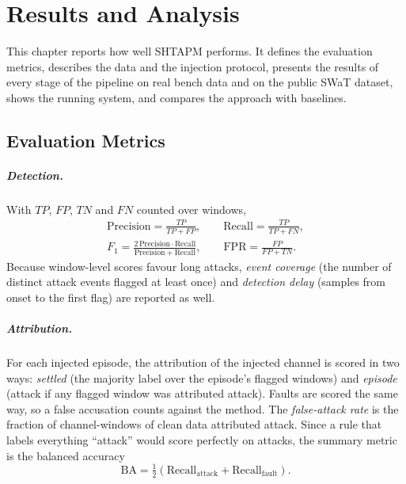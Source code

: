 \chapter{Results and Analysis}
\label{ch:results}

This chapter reports how well SHTAPM performs. It defines the evaluation metrics, describes the data and the injection protocol, presents the results of every stage of the pipeline on real bench data and on the public SWaT dataset, shows the running system, and compares the approach with baselines.

\section{Evaluation Metrics}

\paragraph{Detection.} With $TP$, $FP$, $TN$ and $FN$ counted over windows,
\begin{gather}
\mathrm{Precision} = \frac{TP}{TP + FP}, \qquad
\mathrm{Recall} = \frac{TP}{TP + FN}, \\
F_1 = \frac{2\,\mathrm{Precision}\cdot\mathrm{Recall}}{\mathrm{Precision} + \mathrm{Recall}}, \qquad
\mathrm{FPR} = \frac{FP}{FP + TN}.
\end{gather}
Because window-level scores favour long attacks, \emph{event coverage} (the number of distinct attack events flagged at least once) and \emph{detection delay} (samples from onset to the first flag) are reported as well.

\paragraph{Attribution.} For each injected episode, the attribution of the injected channel is scored in two ways: \emph{settled} (the majority label over the episode's flagged windows) and \emph{episode} (attack if any flagged window was attributed attack). Faults are scored the same way, so a false accusation counts against the method. The \emph{false-attack rate} is the fraction of channel-windows of clean data attributed attack. Since a rule that labels everything ``attack'' would score perfectly on attacks, the summary metric is the balanced accuracy
\begin{equation}
\mathrm{BA} = \tfrac{1}{2}\left(\mathrm{Recall}_{\mathrm{attack}} + \mathrm{Recall}_{\mathrm{fault}}\right).
\end{equation}

